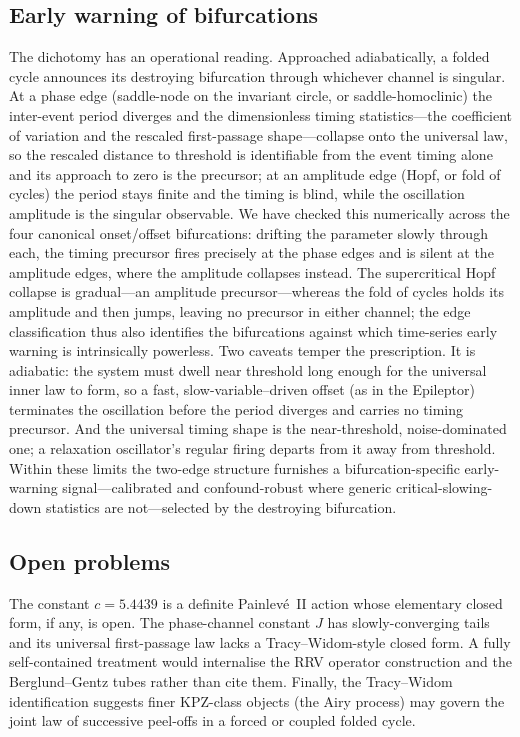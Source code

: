 \documentclass[11pt,reqno]{amsart}
\theoremstyle{plain}
\theoremstyle{definition}
\theoremstyle{remark}
\begin{document}
\subsection{Early warning of bifurcations}
The dichotomy has an operational reading. Approached adiabatically, a folded cycle announces
its destroying bifurcation through whichever channel is singular. At a phase edge (saddle-node
on the invariant circle, or saddle-homoclinic) the inter-event period diverges and the
dimensionless timing statistics---the coefficient of variation and the rescaled
first-passage shape---collapse onto the universal law, so the rescaled distance to threshold
is identifiable from the event timing alone and its approach to zero is the precursor; at an
amplitude edge (Hopf, or fold of cycles) the period stays finite and the timing is blind,
while the oscillation amplitude is the singular observable. We have checked this numerically
across the four canonical onset/offset bifurcations: drifting the parameter slowly through
each, the timing precursor fires precisely at the phase edges and is silent at the amplitude
edges, where the amplitude collapses instead. The supercritical Hopf collapse is gradual---an
amplitude precursor---whereas the fold of cycles holds its amplitude and then jumps, leaving
no precursor in either channel; the edge classification thus also identifies the bifurcations
against which time-series early warning is intrinsically powerless. Two caveats temper the
prescription. It is adiabatic: the system must dwell near threshold long enough for the
universal inner law to form, so a fast, slow-variable--driven offset (as in the Epileptor)
terminates the oscillation before the period diverges and carries no timing precursor. And the
universal timing shape is the near-threshold, noise-dominated one; a relaxation oscillator's
regular firing departs from it away from threshold. Within these limits the two-edge structure
furnishes a bifurcation-specific early-warning signal---calibrated and confound-robust where
generic critical-slowing-down statistics are not---selected by the destroying bifurcation.

\subsection{Open problems}
The constant $c=5.4439$ is a definite Painlev\'e~II action whose elementary closed form, if
any, is open. The phase-channel constant $J$ has slowly-converging tails and its universal
first-passage law lacks a Tracy--Widom-style closed form. A fully self-contained treatment
would internalise the RRV operator construction and the Berglund--Gentz tubes rather than
cite them. Finally, the Tracy--Widom identification suggests finer KPZ-class objects (the
Airy process) may govern the joint law of successive peel-offs in a forced or coupled
folded cycle.
\end{document}
